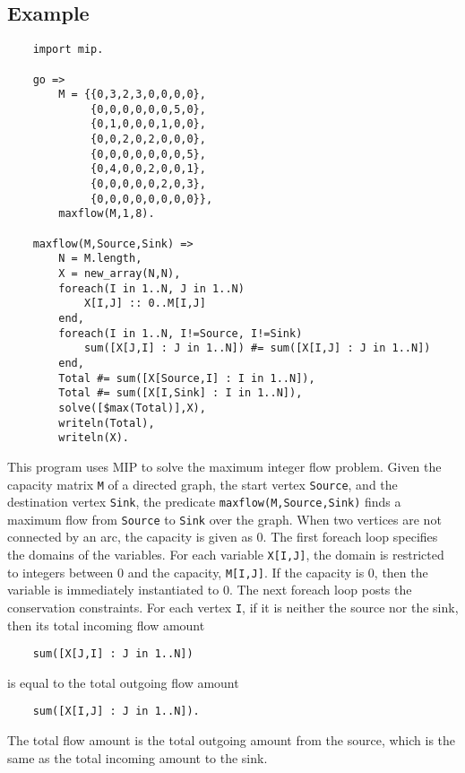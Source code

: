 \subsection*{Example}
\begin{verbatim}
    import mip.

    go =>
        M = {{0,3,2,3,0,0,0,0},
             {0,0,0,0,0,0,5,0},
             {0,1,0,0,0,1,0,0},
             {0,0,2,0,2,0,0,0},
             {0,0,0,0,0,0,0,5},
             {0,4,0,0,2,0,0,1},
             {0,0,0,0,0,2,0,3},
             {0,0,0,0,0,0,0,0}},
        maxflow(M,1,8).

    maxflow(M,Source,Sink) =>
        N = M.length,
        X = new_array(N,N),
        foreach(I in 1..N, J in 1..N)
            X[I,J] :: 0..M[I,J]
        end,
        foreach(I in 1..N, I!=Source, I!=Sink)
            sum([X[J,I] : J in 1..N]) #= sum([X[I,J] : J in 1..N]) 
        end,
        Total #= sum([X[Source,I] : I in 1..N]),
        Total #= sum([X[I,Sink] : I in 1..N]),
        solve([$max(Total)],X),
        writeln(Total),
        writeln(X).
\end{verbatim}
This program uses MIP to solve the maximum integer flow problem. Given the capacity matrix \texttt{M} of a directed graph, the start vertex \texttt{Source}, and the destination vertex \texttt{Sink}, the predicate \texttt{maxflow(M,Source,Sink)} finds a maximum flow from \texttt{Source} to \texttt{Sink} over the graph. When two vertices are not connected by an arc, the capacity is given as 0. The first foreach loop specifies the domains of the variables. For each variable \texttt{X[I,J]}, the domain is restricted to integers between 0 and the capacity, \texttt{M[I,J]}. If the capacity is 0, then the variable is immediately instantiated to 0. The next foreach loop posts the conservation constraints. For each vertex \texttt{I}, if it is neither the source nor the sink, then its total incoming flow amount 
\begin{verbatim}
    sum([X[J,I] : J in 1..N])
\end{verbatim}
is equal to the total outgoing flow amount 
\begin{verbatim}
    sum([X[I,J] : J in 1..N]).
\end{verbatim}
The total flow amount is the total outgoing amount from the source, which is the same as the total incoming amount to the sink.

